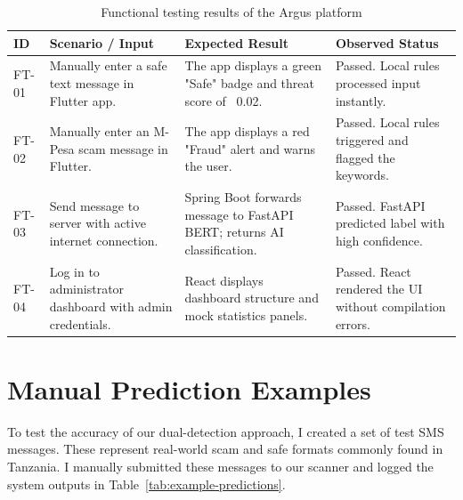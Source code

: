 \begin{table}[htbp]
  \centering
  \caption{Functional testing results of the Argus platform}
  \label{tab:functional-tests}
  \begin{tabularx}{\textwidth}{l p{} p{} X}
    \toprule
    \textbf{ID} & \textbf{Scenario / Input} & \textbf{Expected Result} & \textbf{Observed Status}\\
    \midrule
    FT-01 & Manually enter a safe text message in Flutter app. & The app displays a green "Safe" badge and threat score of ~0.02. & Passed. Local rules processed input instantly.\\
    FT-02 & Manually enter an M-Pesa scam message in Flutter. & The app displays a red "Fraud" alert and warns the user. & Passed. Local rules triggered and flagged the keywords.\\
    FT-03 & Send message to server with active internet connection. & Spring Boot forwards message to FastAPI BERT; returns AI classification. & Passed. FastAPI predicted label with high confidence.\\
    FT-04 & Log in to administrator dashboard with admin credentials. & React displays dashboard structure and mock statistics panels. & Passed. React rendered the UI without compilation errors.\\
    \bottomrule
  \end{tabularx}
\end{table}

\section{Manual Prediction Examples}
To test the accuracy of our dual-detection approach, I created a set of test SMS messages. These represent real-world scam and safe formats commonly found in Tanzania. I manually submitted these messages to our scanner and logged the system outputs in Table~\ref{tab:example-predictions}.

